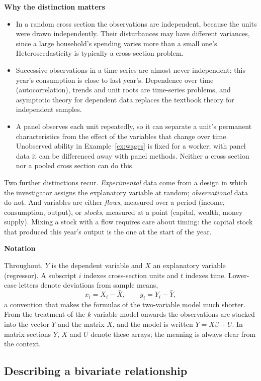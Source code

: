\documentclass[11pt,a4paper]{article}
\numberwithin{equation}{section}
\theoremstyle{definition}
\newcommand{\subhead}[1]{%
  \par\medskip\noindent\textbf{#1}\par\nobreak\smallskip}
\begin{document}
\subhead{Why the distinction matters}
\begin{itemize}
\item In a random cross section the observations are independent, because the units were drawn independently. Their disturbances may have
different variances, since a large household's spending varies more than a small one's. Heteroscedasticity is typically a
cross-section problem.
\item Successive observations in a time series are almost never independent: this year's consumption is close to last year's. Dependence
over time (autocorrelation), trends and unit roots are time-series problems, and asymptotic theory for dependent data replaces the
textbook theory for independent samples.
\item A panel observes each unit repeatedly, so it can separate a unit's permanent characteristics from the effect of the variables that
change over time. Unobserved ability in Example~\ref{ex:wages} is fixed for a worker; with panel data it can be differenced away
with panel methods. Neither a cross section nor a pooled cross section can do this.
\end{itemize}

Two further distinctions recur. \emph{Experimental} data come from a design in which the investigator assigns the explanatory variable at
random; \emph{observational} data do not. And variables are either \emph{flows}, measured over a period (income, consumption, output), or
\emph{stocks}, measured at a point (capital, wealth, money supply). Mixing a stock with a flow requires care about timing: the capital stock
that produced this year's output is the one at the start of the year.

\subhead{Notation}
Throughout, $Y$ is the dependent variable and $X$ an explanatory variable (regressor). A subscript $i$ indexes cross-section units and $t$
indexes time. Lower-case letters denote deviations from sample means,
\[
x_i = X_i - \bar X, \qquad y_i = Y_i - \bar Y ,
\]
a convention that makes the formulas of the two-variable model much shorter. From the treatment of the $k$-variable model onwards the observations are stacked into the
vector $Y$ and the matrix $X$, and the model is written $Y = X\beta + U$. In matrix sections $Y$, $X$ and $U$ denote these arrays; the meaning
is always clear from the context.

\subsection{Describing a bivariate relationship}
\label{ssec:corr}
\end{document}

